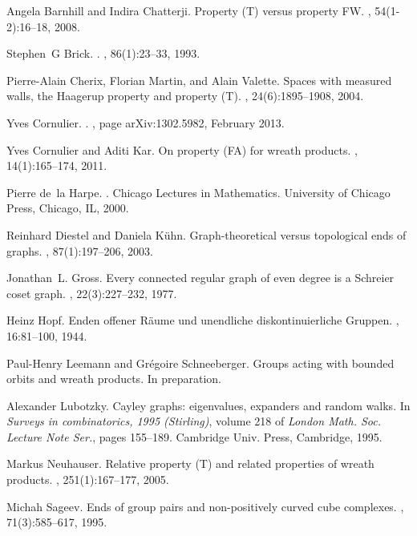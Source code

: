 \documentclass[a4paper]{article}
\theoremstyle{definition}
\theoremstyle{remark}%
\begin{document}
\begin{thebibliography}{10}

Angela Barnhill and Indira Chatterji.
\newblock Property ({T}) versus property {FW}.
, 54(1-2):16--18, 2008.

Stephen~G Brick.
.
, 86(1):23--33, 1993.

Pierre-Alain Cherix, Florian Martin, and Alain Valette.
\newblock Spaces with measured walls, the {H}aagerup property and property
  ({T}).
, 24(6):1895--1908, 2004.

Yves {Cornulier}.
.
, page arXiv:1302.5982, February 2013.

Yves Cornulier and Aditi Kar.
\newblock On property ({FA}) for wreath products.
, 14(1):165--174, 2011.

Pierre de~la Harpe.
.
\newblock Chicago Lectures in Mathematics. University of Chicago Press,
  Chicago, IL, 2000.

Reinhard Diestel and Daniela K\"{u}hn.
\newblock Graph-theoretical versus topological ends of graphs.
, 87(1):197--206, 2003.

Jonathan~L. Gross.
\newblock Every connected regular graph of even degree is a {S}chreier coset
  graph.
, 22(3):227--232, 1977.

Heinz Hopf.
\newblock Enden offener {R}\"{a}ume und unendliche diskontinuierliche
  {G}ruppen.
, 16:81--100, 1944.

Paul-Henry Leemann and Gr{\'e}goire Schneeberger.
\newblock Groups acting with bounded orbits and wreath products.
\newblock In preparation.

Alexander Lubotzky.
\newblock Cayley graphs: eigenvalues, expanders and random walks.
\newblock In {\em Surveys in combinatorics, 1995 ({S}tirling)}, volume 218 of
  {\em London Math. Soc. Lecture Note Ser.}, pages 155--189. Cambridge Univ.
  Press, Cambridge, 1995.

Markus Neuhauser.
\newblock Relative property ({T}) and related properties of wreath products.
, 251(1):167--177, 2005.

Michah Sageev.
\newblock Ends of group pairs and non-positively curved cube complexes.
, 71(3):585--617, 1995.

\end{thebibliography}

%
%
%
%
%
\enddocument
\end{document}

